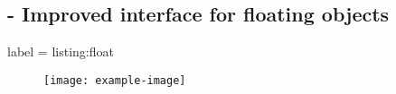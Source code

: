 
\subsection{ - Improved interface for floating objects}

\begin{tcblisting}{label = listing:float}
  \begin{figure}[H]
    \centering
    \texttt{[image: example-image]}
    \caption{}
  \end{figure}
\end{tcblisting}
